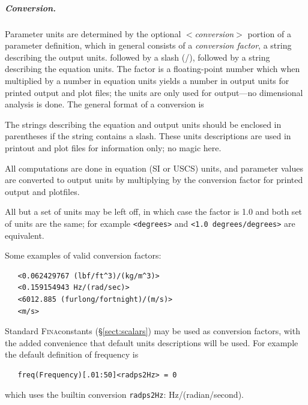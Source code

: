 \documentclass[10pt,openany,twoside]{book}
\numberwithin{equation}{section}   %
\newcommand{\Subst}[1]{{\sl\sf #1}}
\newcommand{\Newterm}[1]{{\em #1}}
\newcommand{\Code}[1]{{\small\tt #1}}
\newcommand{\Fina}{{\normalfont\scshape Fina\:}}
\newcommand{\Sectref}[1]{\S\ref{#1}}
\begin{document}
\subparagraph{Conversion.}\label{sect:parunits}
Parameter units are determined by the optional
$<$\Subst{conversion}$>$\/ portion of a parameter
definition, which in general consists of a \Newterm{conversion factor},
a string describing the output units.
followed by a slash (/),
followed by a string describing the equation units.
The factor is a floating-point number which when multiplied by a number
in equation units yields a number in output units for
printed output and plot files; the units are
only used for output---no dimensional analysis is done.
The general format of a conversion is
\vspace{1.5ex}
\begin{center}
\fbox{$<$ \Subst{factor}\ (\Subst{output units})/(\Subst{equation units})$>$}
\end{center}
\vspace{1.5ex}
\par
The strings describing the equation and output units should be enclosed
in parentheses if the string contains a slash.
These units descriptions are used in printout and plot files
for information only; no magic here.
\par
All computations are done in equation (SI or USCS) units, and parameter
values are converted to output units by  multiplying by the
conversion factor for printed output and plotfiles.
\par
All but a set of units may be left off, in which case the factor is 1.0
and both set of units are the same; for example \Code{<degrees>} and
\Code{<1.0 degrees/degrees>} are equivalent.

Some examples of valid conversion factors:
\begin{lstlisting}
   <0.062429767 (lbf/ft^3)/(kg/m^3)>
   <0.159154943 Hz/(rad/sec)>
   <6012.885 (furlong/fortnight)/(m/s)>
   <m/s>
\end{lstlisting}
\par
Standard \Fina constants (\Sectref{sect:scalars})
may be used as conversion factors, with the added convenience
that default units descriptions will be used. For example
the default definition of frequency is
\begin{lstlisting}
   freq(Frequency)[.01:50]<radps2Hz> = 0
\end{lstlisting}
which uses the builtin conversion \Code{radps2Hz}: Hz/(radian/second).
\end{document}

